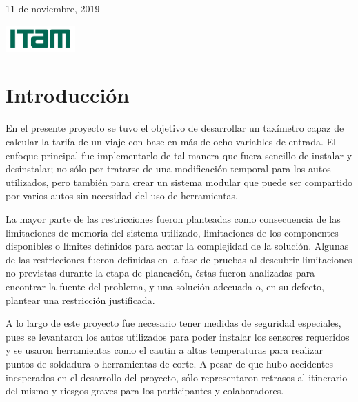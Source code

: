 \documentclass[a4paper,11pt]{article}
\begin{document}
\begin{titlepage}
	
	\vfill\vfill\vfill %
	
	{\large 11 de noviembre, 2019} %
	
	
	\includegraphics[width=0.2\textwidth]{itam.jpg}\\[1cm] %
	 
	
	\vfill %
	
\end{titlepage}

\section*{Introducción}
En el presente proyecto se tuvo el objetivo de desarrollar un taxímetro capaz de calcular la tarifa de un viaje con base en más de ocho variables de entrada. 
El enfoque principal fue implementarlo de tal manera que fuera sencillo de instalar y desinstalar; no sólo por tratarse de una modificación temporal para los autos utilizados, 
pero también para crear un sistema modular que puede ser compartido por varios autos sin necesidad del uso de herramientas.
    
La mayor parte de las restricciones fueron planteadas como consecuencia de las limitaciones de memoria del sistema utilizado, 
limitaciones de los componentes disponibles o límites definidos para acotar la complejidad de la solución. Algunas de las restricciones fueron definidas en la fase de pruebas al descubrir limitaciones no previstas durante la etapa de planeación, éstas fueron analizadas para encontrar la fuente del problema, y una solución adecuada o, en su defecto, plantear una restricción justificada. 

A lo largo de este proyecto fue necesario tener medidas de seguridad especiales, pues se levantaron los autos utilizados para poder instalar los sensores requeridos y se usaron herramientas como el cautin a altas temperaturas para realizar puntos de soldadura o herramientas de corte. A pesar de que hubo accidentes inesperados en el desarrollo del proyecto, sólo representaron retrasos al itinerario del mismo y riesgos graves para los participantes y colaboradores.
\end{document}
